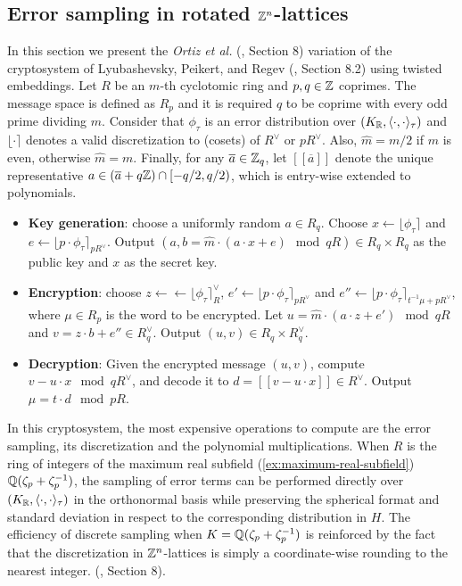 \documentclass[a4paper,12pt]{article}
\begin{document}
\subsection{Error sampling in rotated \(\mathbb{Z}^n\)-lattices}
\label{sec:orgf2a5e1b}

\begin{text}
  In this section we present the \textit{Ortiz et al.} (\cite{Ortiz2021}, Section 8)
  variation of the cryptosystem of Lyubashevsky, Peikert, and Regev
  (\cite{LPV2013}, Section 8.2) using twisted embeddings. Let $R$ be an $m$-th
  cyclotomic ring and $p, q \in \mathbb{Z}$ coprimes. The message space is defined as
  $R_p$ and it is required $q$ to be coprime with every odd prime dividing
  $m$. Consider that $\phi_\tau$ is an error distribution over $(K_{\mathbb{R}},\langle{\cdot,\cdot}\rangle_\tau)$
  and $\lfloor{\cdot}\rceil$ denotes a valid discretization to (cosets) of $R^\vee$ or $pR^\vee$.
  Also, $\hat{m} = m/2$ if $m$ is even, otherwise $\hat{m} = m$. Finally, for any
  $\overline{a} \in \mathbb{Z}_q$, let $[[\overline{a}]]$ denote the unique representative
  $a \in (\overline{a} + q\mathbb{Z}) \cap [-q/2, q/2)$, which is entry-wise extended to
  polynomials.

  \begin{itemize}
  \item \textbf{Key generation}: choose a uniformly random $a \in R_q$. Choose $x
    \longleftarrow \lfloor{\phi_\tau}\rceil$ and $e \longleftarrow \lfloor{p \cdot \phi_\tau}\rceil_{pR^\vee}$. Output $(a,b = \hat{m}\cdot(a \cdot x + e)
    \mod{qR} ) \in R_q \times R_q$ as the public key and $x$ as the secret key.
  \item \textbf{Encryption}: choose $z \longleftarrow \longleftarrow \lfloor{\phi_\tau}\rceil_R^\vee$, $e' \longleftarrow \lfloor{p \cdot
      \phi_\tau}\rceil_{pR^\vee}$ and  $e'' \longleftarrow \lfloor{p \cdot \phi_\tau}\rceil_{t^{-1}\mu +pR^\vee}$, where $\mu \in R_p$ is
    the word to be encrypted. Let $u = \hat{m} \cdot (a \cdot z + e') \mod{qR}$ and $v =
    z \cdot b + e'' \in R_q^\vee$. Output $(u,v) \in R_q \times R^\vee_q$.
  \item \textbf{Decryption}: Given the encrypted message $(u,v)$, compute $v - u
    \cdot x \mod{qR^\vee}$, and decode it to $d = [[v - u \cdot x]] \in R^\vee$. Output $\mu = t \cdot
    d \mod{pR}$. 
  \end{itemize}

  In this cryptosystem, the most expensive operations to compute are the error
  sampling, its discretization and the polynomial multiplications. When $R$ is
  the ring of integers of the maximum real subfield
  (\ref{ex:maximum-real-subfield}) $\mathbb{Q}(\zeta_{p} + \zeta_{p} ^{-1})$, the sampling of error
  terms can be performed directly over $(K_{\mathbb{R}}, \langle{\cdot,\cdot}\rangle_\tau)$ in the orthonormal
  basis while preserving the spherical format and standard deviation in respect
  to the corresponding distribution in $H$. The efficiency
of discrete sampling when $K = \mathbb{Q}(\zeta_p + \zeta_p^{-1})$ is reinforced by the fact
that the discretization in $\mathbb{Z}^n$-lattices is simply a coordinate-wise rounding to the nearest integer. (\cite{Ortiz2021}, Section 8).
\end{text}
\end{document}
